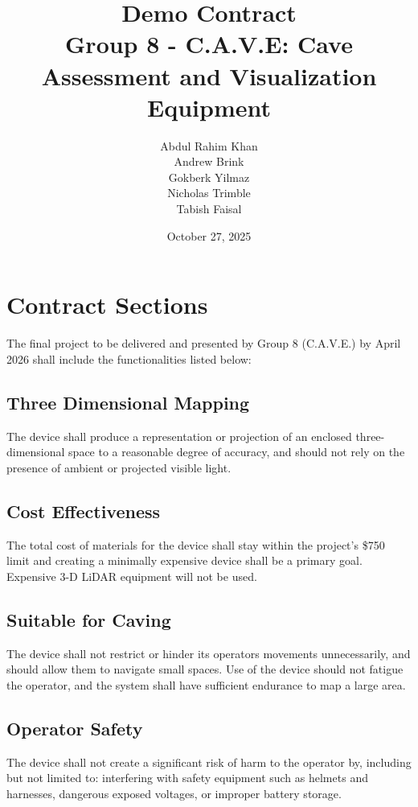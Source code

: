 \documentclass[11pt]{article}
\title{\bf{Demo Contract \\ \large Group 8 - C.A.V.E: Cave Assessment and Visualization Equipment}}
\author{Abdul Rahim Khan \\ Andrew Brink \\ Gokberk Yilmaz \\ Nicholas Trimble \\ Tabish Faisal}
\date{October 27, 2025}
\begin{document}
    \maketitle
    \newpage
    \section{Contract Sections}
        The final project to be delivered and presented by Group 8 (C.A.V.E.) by April 2026 shall include the functionalities listed below:
        \subsection{Three Dimensional Mapping}
            The device shall produce a representation or projection of an enclosed three-dimensional space to a reasonable degree of accuracy, and should not rely on the presence of ambient or projected visible light. 
        \subsection{Cost Effectiveness}
            The total cost of materials for the device shall stay within the project's \$750 limit and creating a minimally expensive device shall be a primary goal. Expensive 3-D LiDAR equipment will not be used.
        \subsection{Suitable for Caving}
            The device shall not restrict or hinder its operators movements unnecessarily, and should allow them to navigate small spaces. Use of the device should not fatigue the operator, and the system shall have sufficient endurance to map a large area.
        \subsection{Operator Safety}
            The device shall not create a significant risk of harm to the operator by, including but not limited to: interfering with safety equipment such as helmets and harnesses, dangerous exposed voltages, or improper battery storage.
\end{document}
